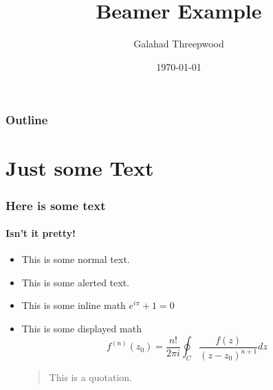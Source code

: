\documentclass{beamer}
\title{Beamer Example}
\author{Galahad Threepwood}
\institute{Blandings Castle}
\date{\today}
\begin{document}
\begin{frame}[plain]
  \titlepage
\end{frame}

\begin{frame}
  \frametitle{Outline}
  \tableofcontents
\end{frame}

\section{Just some Text}
\begin{frame}
  \frametitle{Here is some text}
  \framesubtitle{Isn't it pretty!}
  \begin{itemize}[<+->]
  \item This is some normal text.\\
  \item This is some \alert{alerted text.}\\
  \item This is some inline math $e^{i\pi} + 1 =0$
  \item This is some displayed math
    \begin{equation}
      f^{(n)}(z_0) = \frac{n!}{2\pi i}\oint_C \frac{f(z)}{(z-z_0)^{n+1}} dz
    \end{equation}
    \begin{quotation}
      This is a quotation.
    \end{quotation}
  \end{itemize}
\end{frame}
\end{document}
